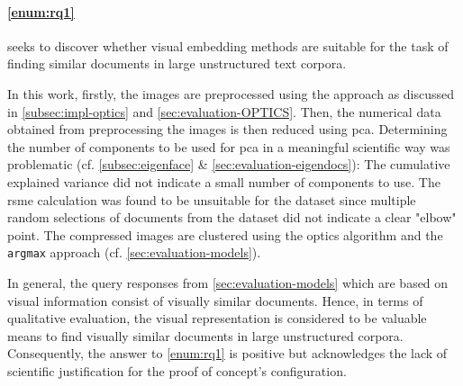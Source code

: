 \paragraph{\ref{enum:rq1}} seeks to discover whether visual embedding methods are suitable 
for the task of finding similar documents in large unstructured text corpora.

In this work, firstly, the images are preprocessed using the \eigendocs{} approach as discussed in \autoref{subsec:impl-optics} and \autoref{sec:evaluation-OPTICS}. 
Then, the numerical data obtained from preprocessing the images is then reduced using \ac{pca}.
Determining the number of components to be used for \ac{pca} in a meaningful scientific way was problematic 
(cf. \autoref{subsec:eigenface} \& \autoref{sec:evaluation-eigendocs}):
The cumulative explained variance did not indicate a small number of components to use.
The \ac{rsme} calculation was found to be unsuitable for the dataset since 
multiple random selections of documents from the dataset did not indicate a clear "elbow" point.
The compressed images are clustered using the \ac{optics} algorithm and the \texttt{argmax} approach (cf. \autoref{sec:evaluation-models}).

In general, the query responses from \autoref{sec:evaluation-models} which are based on visual information 
consist of visually similar documents.
Hence, in terms of qualitative evaluation, the visual representation is considered to be 
valuable means to find visually similar documents in large unstructured corpora.
Consequently, the answer to \ref{enum:rq1} is positive but 
acknowledges the lack of scientific justification for the proof of concept's configuration.